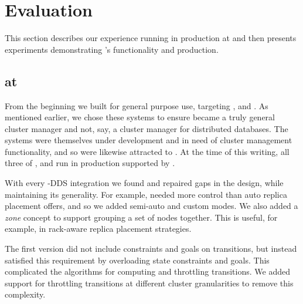 \section{Evaluation}
\label{sec:eval}
%
This section describes our experience running \helix in production at \linkedin and
then presents experiments demonstrating \helix's functionality and production.

\subsection{\helix at \linkedin}
\label{sec:production}
%
From the beginning we built \helix for general purpose use, targeting \ES, \seas
and \databus.  As mentioned earlier, we chose these systems
to ensure \helix became a truly general cluster manager and not, say, a
cluster manager for distributed databases. 
The systems were themselves under development and in need of cluster management
functionality, and so were likewise attracted to \helix.
At the time of this writing, all three of \ES, \seas and \databus run in
production supported by \helix.

With every \helix-DDS integration we found and repaired gaps in the \helix
design, while maintaining its generality.  For example, \seas needed more
control than auto replica placement offers, and so we added semi-auto and
custom modes.
We also added a \emph{zone} concept to support grouping a set of
nodes together.  This is useful, for example, in rack-aware replica placement
strategies.  

The first \helix version did not include constraints and goals on transitions, but instead
satisfied this requirement by overloading state constraints and goals.  This complicated
the algorithms for computing and throttling transitions.  We added support for
throttling transitions at different cluster granularities to remove this
complexity.


